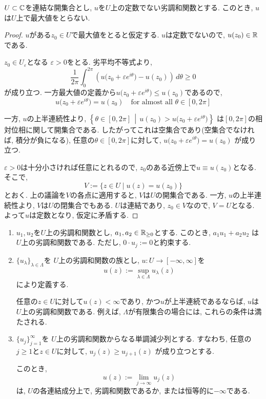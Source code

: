 \begin{tcolorbox}[mybox]
\begin{thm}
$U \subset \mathbb{C}$を連結な開集合とし,
$u$を$U$上の定数でない劣調和関数とする.
このとき, $u$は$U$上で最大値をとらない.
\end{thm}
\end{tcolorbox}

\begin{proof}
$u$がある$z_0 \in U$で最大値をとると仮定する.
$u$は定数でないので, $u(z_0) \in \mathbb{R}$である.

$z_0 \in U_\varepsilon$となる
$\varepsilon > 0$をとる.
劣平均不等式より,
\[
\frac{1}{2\pi}
\int_0^{2\pi}
\left(
u\bigl(z_0+\varepsilon e^{i\theta}\bigr)-u(z_0)
\right)\,d\theta
\geq 0
\]
が成り立つ.
一方最大値の定義から$u\bigl(z_0+\varepsilon e^{i\theta}\bigr) \le u(z_0)$であるので, 
$$
u\bigl(z_0+\varepsilon e^{i\theta}\bigr) 
=u(z_0)
\quad \text{for almost all $\theta \in [0, 2\pi]$}
$$

一方, $u$の上半連続性より,
\(
\left\{
\theta \in [0,2\pi]
\,\middle|\,
u(z_0)>u\bigl(z_0+\varepsilon e^{i\theta}\bigr)
\right\}
\)
は$[0,2\pi]$の相対位相に関して開集合である.
したがってこれは空集合であり(空集合でなければ, 積分が負になる), 
任意の$\theta \in [0,2\pi]$に対して,
\(
u\bigl(z_0+\varepsilon e^{i\theta}\bigr)=u(z_0)
\)
が成り立つ.

$\varepsilon > 0$は十分小さければ任意にとれるので,
$z_0$のある近傍上で$u \equiv u(z_0)$となる.
そこで,
\[
V:=\{z \in U \mid u(z)=u(z_0)\}
\]
とおく.
上の議論を$V$の各点に適用すると,
$V$は$U$の開集合である.
一方, $u$の上半連続性より,
$V$は$U$の閉集合でもある.
$U$は連結であり, $z_0 \in V$なので, $V=U$となる.
よって$u$は定数となり, 仮定に矛盾する.
\end{proof}

\begin{tcolorbox}[mybox]
\begin{lem}
\begin{enumerate}[label=(\roman*)]
\item
$u_1,u_2$を$U$上の劣調和関数とし,
$a_1,a_2 \in \mathbb{R}_{\geq 0}$とする.
このとき,
\(
a_1u_1+a_2u_2
\)
は$U$上の劣調和関数である.
ただし, $0 \cdot u_j:=0$と約束する.

\item
$\{u_\lambda\}_{\lambda \in \Lambda}$を
$U$上の劣調和関数の族とし,
$u \colon U \to [-\infty,\infty]$を
\[
u(z):=\sup_{\lambda \in \Lambda}u_\lambda(z)
\]
により定義する.

任意の$z \in U$に対して$u(z)<\infty$であり,
かつ$u$が上半連続であるならば,
$u$は$U$上の劣調和関数である.
例えば, $\Lambda$が有限集合の場合には,
これらの条件は満たされる.

\item
$\{u_j\}_{j=1}^{\infty}$を
$U$上の劣調和関数からなる単調減少列とする.
すなわち, 任意の$j \geq 1$と$z \in U$に対して,
\(
u_j(z) \geq u_{j+1}(z)
\)
が成り立つとする.

このとき,
\[
u(z):=\lim_{j \to \infty}u_j(z)
\]
は, $U$の各連結成分上で,
劣調和関数であるか, または恒等的に$-\infty$である.

\end{enumerate}
\end{lem}
\end{tcolorbox}

